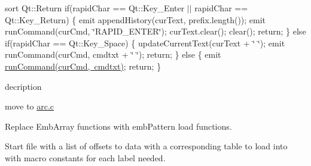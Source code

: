 \begin{DoxyRefList}
%
sort Qt\+::\+Return if(rapid\+Char == Qt\+::\+Key\+\_\+\+Enter $\vert$$\vert$ rapid\+Char == Qt\+::\+Key\+\_\+\+Return) \{ emit append\+History(cur\+Text, prefix.\+length()); emit run\+Command(cur\+Cmd, \char`\"{}\+RAPID\+\_\+\+ENTER\char`\"{}); cur\+Text.\+clear(); clear(); return; \} else if(rapid\+Char == Qt\+::\+Key\+\_\+\+Space) \{ update\+Current\+Text(cur\+Text + \char`\"{} \char`\"{}); emit run\+Command(cur\+Cmd, cmdtxt + \char`\"{} \char`\"{}); return; \} else \{ emit \mbox{\hyperlink{class_cmd_prompt_input_aa506049eb78e7b035aa76af84f4ffcef}{run\+Command(cur\+Cmd, cmdtxt)}}; return; \}  
\item[Global \mbox{\hyperlink{main_8c_a5d7bf5f964ae87921bab916b871ea2dd}{copy\+\_\+trim}} (char const $\ast$s)]\label{todo__todo000030}%
%
decription  
\item[Global \mbox{\hyperlink{main_8c_a16e1e46c5c33874fc9a63476e70c0d66}{emb\+Arc\+\_\+print}} (Emb\+Arc arc)]\label{todo__todo000029}%
%
move to \mbox{\hyperlink{arc_8c}{arc.\+c}}  
\item[Page \mbox{\hyperlink{md_embroidermodder2_extern_libembroidery_src_embedded}{embedded}} ]\label{todo__todo000003}%
%
Replace Emb\+Array functions with emb\+Pattern load functions.

\label{todo__todo000004}%
%
Start file with a list of offsets to data with a corresponding table to load into with macro constants for each label needed.


\end{DoxyRefList}
